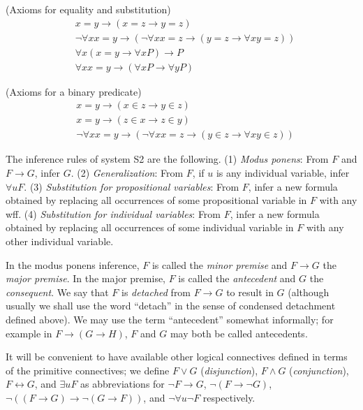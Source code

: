 \documentclass[leqno]{article}
\begin{document}
  (Axioms for equality and substitution)
\begin{eqnarray}
    & x=y\rightarrow (x=z\rightarrow y=z) \\
    & \lnot \forall xx=y\rightarrow (\lnot \forall xx=z\rightarrow
      (y=z\rightarrow \forall xy=z)) \\
    & \forall x(x=y\rightarrow \forall xP)\rightarrow P \\
    & \forall xx=y\rightarrow (\forall xP\rightarrow \forall yP)
\end{eqnarray}

  (Axioms for a binary predicate)
\begin{eqnarray}
    & x=y\rightarrow (x\in z\rightarrow y\in z) \\
    & x=y\rightarrow (z\in x\rightarrow z\in y) \\
    & \lnot \forall xx=y\rightarrow (\lnot \forall xx=z\rightarrow (y\in
        z\rightarrow \forall xy\in z))
\end{eqnarray}

The inference rules of system S2 are the following.
(1) {\em Modus ponens}:  From $F$ and $F\rightarrow G$, infer $G$.
(2) {\em Generalization}:  From $F$, if $u$ is any individual variable, infer
        $\forall uF$.
(3) {\em Substitution for propositional variables}:  From $F$, infer a new
  formula obtained by replacing all occurrences of some propositional
  variable in $F$ with any wff.
(4) {\em Substitution for individual variables}:  From $F$, infer a new
  formula obtained by replacing all occurrences of some individual variable in
  $F$ with any other individual variable.

     In the modus ponens inference, $F$ is called the {\em minor premise} and
$F\rightarrow G$ the {\em major premise}.  In the major premise, $F$ is
called the {\em antecedent} and $G$ the {\em consequent}.  We say that $F$ is
{\em detached} from $F\rightarrow G$ to result in $G$ (although usually we
shall use the word ``detach'' in the sense of condensed detachment
defined above).  We may use the term ``antecedent'' somewhat informally; for
example in $F\rightarrow (G\rightarrow H)$, $F$ and $G$ may both be called
antecedents.

     It will be convenient to have available other logical connectives defined
in terms of the primitive connectives; we define $F\vee G$ ({\em disjunction}),
$F\wedge G$ ({\em conjunction}), $F\leftrightarrow G$, and $\exists uF$ as
abbreviations for $\lnot F\rightarrow G$, $\lnot (F\rightarrow \lnot G)$,
$\lnot ((F\rightarrow G)\rightarrow \lnot (G\rightarrow F))$, and $\lnot
\forall u\lnot F$ respectively.
\end{document}
